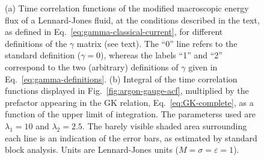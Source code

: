 \begin{figure}
    \begin{center}
    \end{center}
	\caption{(a) Time correlation functions of the modified macroscopic energy flux of a Lennard-Jones fluid, at the conditions described in the text, as defined in Eq.~\eqref{eq:gamma-classical-current}, for different definitions of the $\gamma$ matrix (see text). The ``0'' line refers to the standard definition ($\gamma = 0$), whereas the labels ``1'' and ``2'' correspond to the two (arbitrary) definitions of $\gamma$ given in Eq.~\eqref{eq:gamma-definitions}.
    (b) Integral of the time correlation functions displayed in Fig.~\ref{fig:argon-gauge-acf}, multiplied by the prefactor appearing in the GK relation, Eq.~\eqref{eq:GK-complete}, as a function of the upper limit of integration. 
    The parameterss used are $\lambda_1=10$ and $\lambda_2=2.5$. The barely visible shaded area surrounding each line is an indication of the error bars, as estimated by standard block analysis. Units are Lennard-Jones units ($M=\sigma=\varepsilon=1$). \label{fig:argon-gauge}}
\end{figure}

